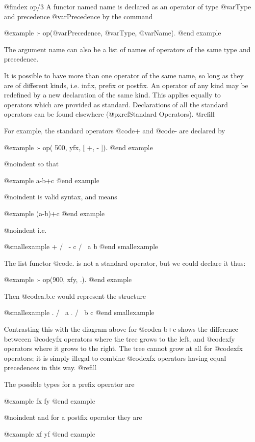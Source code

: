 {@findex op/3
A functor named name is declared as an operator of type @var{Type} and
precedence @var{Precedence} by the command

@example
:- op(@var{Precedence}, @var{Type}, @var{Name}).
@end example

The argument name can also be a list of names of operators of the same
type and precedence.

It is possible to have more than one operator of the same name, so long as
they are of different kinds, i.e. infix, prefix or postfix.  An operator of
any kind may be redefined by a new declaration of the same kind.  This
applies equally to operators which are provided as standard.  Declarations
of all the standard operators can be found elsewhere (@pxref{Standard
Operators}). @refill

For example, the standard operators @code{+} and @code{-} are declared by

@example
:- op(  500, yfx, [ +, - ]).
@end example

@noindent
so that 

@example
a-b+c
@end example

@noindent
is valid syntax, and means 

@example
(a-b)+c
@end example

@noindent
i.e. 

@smallexample
     +
   /   \
  -     c
 / \
a   b
@end smallexample

The list functor @code{.} is not a standard operator, but we could declare it
thus:

@example
:- op(900, xfy, .).
@end example

Then @code{a.b.c} would represent the structure 

@smallexample
  .
 / \
a   .
   / \
  b   c
@end smallexample

Contrasting this with the diagram above for @code{a-b+c} shows the
difference betweeen @code{yfx} operators where the tree grows to the left,
and @code{xfy} operators where it grows to the right.  The tree cannot grow
at all for @code{xfx} operators; it is simply illegal to combine @code{xfx}
operators having equal precedences in this way. @refill

The possible types for a prefix operator are 

@example
fx      fy
@end example

@noindent
and for a postfix operator they are 

@example
xf      yf
@end example

}
